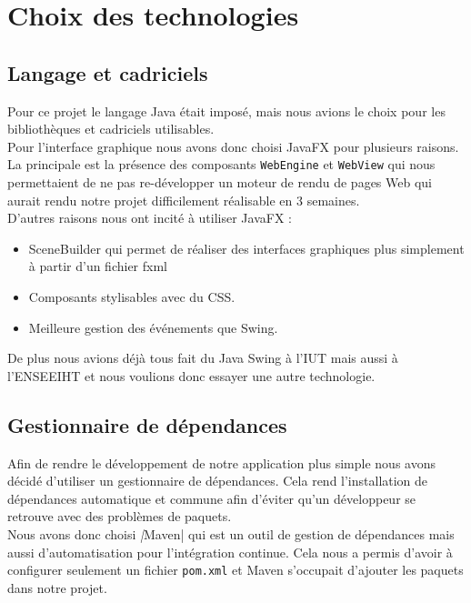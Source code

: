 \documentclass[10pt,a4paper]{article}
\begin{document}
\newpage



\section{Choix des technologies}

\subsection{Langage et cadriciels}

Pour ce projet le langage Java était imposé, mais nous avions le choix pour les bibliothèques et cadriciels utilisables.\\

Pour l'interface graphique nous avons donc choisi JavaFX pour plusieurs raisons. La principale est la présence des composants \verb|WebEngine| et \verb|WebView| qui nous permettaient de ne pas re-développer un moteur de rendu de pages Web qui aurait rendu notre projet difficilement réalisable en 3 semaines. \\
D'autres raisons nous ont incité à utiliser JavaFX :
\begin{itemize}
\item SceneBuilder qui permet de réaliser des interfaces graphiques plus simplement à partir d'un fichier fxml 
\item Composants stylisables avec du CSS.
\item Meilleure gestion des événements que Swing. \\
\end{itemize} 

De plus nous avions déjà tous fait du Java Swing à l'IUT mais aussi à l'ENSEEIHT et nous voulions donc essayer une autre technologie.

\subsection{Gestionnaire de dépendances}

Afin de rendre le développement de notre application plus simple nous avons décidé d'utiliser un gestionnaire de dépendances. Cela rend l'installation de dépendances automatique et commune afin d'éviter qu'un développeur se retrouve avec des problèmes de paquets.\\
Nous avons donc choisi \textit|Maven| qui est un outil de gestion de dépendances mais aussi d'automatisation pour l'intégration continue.
Cela nous a permis d'avoir à configurer seulement un fichier \verb|pom.xml| et Maven s'occupait d'ajouter les paquets dans notre projet.
\end{document}
